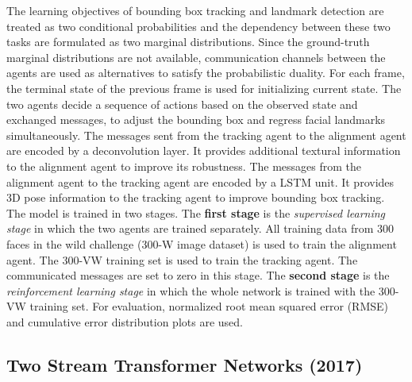 \documentclass{llncs}
\begin{document}
The learning objectives of bounding box tracking and landmark detection are treated as two conditional probabilities and the dependency between these two tasks are formulated as two marginal distributions. Since the ground-truth marginal distributions are not available, communication channels between the agents are used as alternatives to satisfy the probabilistic duality. For each frame, the terminal state of the previous frame is used for initializing current state. The two agents decide a sequence of actions based on the observed state and exchanged messages, to adjust the bounding box and regress facial landmarks simultaneously. The messages sent from the tracking agent to the alignment agent are encoded by a deconvolution layer. It provides additional textural information to the alignment agent to improve its robustness. The messages from the alignment agent to the tracking agent are encoded by a LSTM unit. It provides 3D pose information to the tracking agent to improve bounding box tracking.\\

The model is trained in two stages. The \textbf{first stage} is the \textit{supervised learning stage} in which the two agents are trained separately. All training data from 300 faces in the wild challenge (300-W image dataset) is used to train the alignment agent. The 300-VW training set is used to train the tracking agent. The communicated messages are set to zero in this stage. The \textbf{second stage} is the \textit{reinforcement learning stage} in which the whole network is trained with the 300-VW training set. For evaluation, normalized root mean squared error (RMSE) and cumulative error distribution plots are used.





\subsection{Two Stream Transformer Networks (2017) \cite{tstn}}
\end{document}
